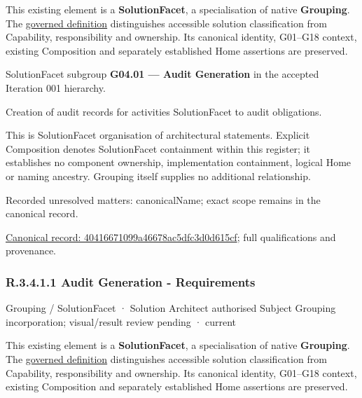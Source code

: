This existing element is a \textbf{SolutionFacet}, a specialisation of native
\textbf{Grouping}. The \href{\detokenize{../../../../../../../governance/continuum-representation.md#solutionfacet-classification--1119-candidate}}{governed definition}
distinguishes accessible solution classification from Capability, responsibility
and ownership. Its canonical identity, G01–G18 context, existing Composition
and separately established Home assertions are preserved.



SolutionFacet subgroup \textbf{G04.01 — Audit Generation} in the accepted Iteration 001 hierarchy.



Creation of audit records for activities SolutionFacet to audit obligations.



This is SolutionFacet organisation of architectural statements. Explicit Composition denotes SolutionFacet containment within this register; it establishes no component ownership, implementation containment, logical Home or naming ancestry. Grouping itself supplies no additional relationship.


{\small Recorded unresolved matters: canonicalName; exact scope remains in the canonical record.}\par
{\footnotesize \href{../../../../../../../continuum/grouping/40416671099a46678ac5dfc3d0d615cf.md}{Canonical record: 40416671099a46678ac5dfc3d0d615cf}; full qualifications and provenance.}\par
\subsubsection*{R.3.4.1.1 Audit Generation - Requirements}
\label{navigation:R.3.4.1.1}

\label{element:9fec9301e759460880557df71baa19c0}
{\small Grouping / SolutionFacet · Solution Architect authorised Subject Grouping incorporation; visual/result review pending · current}\par

This existing element is a \textbf{SolutionFacet}, a specialisation of native
\textbf{Grouping}. The \href{\detokenize{../../../../../../../governance/continuum-representation.md#solutionfacet-classification--1119-candidate}}{governed definition}
distinguishes accessible solution classification from Capability, responsibility
and ownership. Its canonical identity, G01–G18 context, existing Composition
and separately established Home assertions are preserved.



